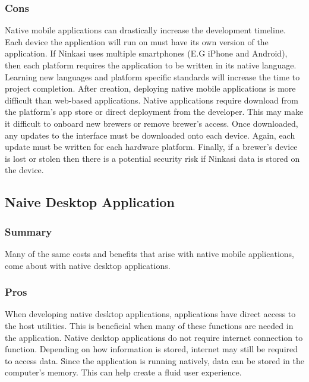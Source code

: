 \documentclass[draftclsnofoot,onecolumn,letterpaper,10pt,compsoc]{IEEEtran}
\begin{document}
		        \subsubsection{Cons}
		            Native mobile applications can drastically increase the development timeline.
		            Each device the application will run on must have its own version of the application.
		            If Ninkasi uses multiple smartphones (E.G iPhone and Android), then each platform requires the application to be written in its native language.
		            Learning new languages and platform specific standards will increase the time to project completion.
		            After creation, deploying native mobile applications is more difficult than web-based applications.
		            Native applications require download from the platform's app store or direct deployment from the developer.
		            This may make it difficult to onboard new brewers or remove brewer's access.
		            Once downloaded, any updates to the interface must be downloaded onto each device.
		            Again, each update must be written for each hardware platform.
		            Finally, if a brewer's device is lost or stolen then there is a potential security risk if Ninkasi data is stored on the device.


			\subsection{Naive Desktop Application}
		        \subsubsection{Summary}
		            Many of the same costs and benefits that arise with native mobile applications, come about with native desktop applications.

		        \subsubsection{Pros}
		            When developing native desktop applications, applications have direct access to the host utilities.
		            This is beneficial when many of these functions are needed in the application.
		            Native desktop applications do not require internet connection to function.
		            Depending on how information is stored, internet may still be required to access data.
		            Since the application is running natively, data can be stored in the computer's memory.
		            This can help create a fluid user experience.
\end{document}

